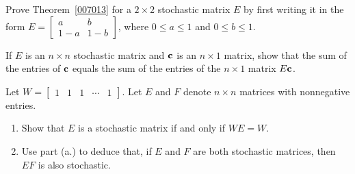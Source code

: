 \documentclass{ximera}
\begin{document}
\begin{problem}\label{prob:2x2proof}
Prove Theorem~\ref{007013} for a $2 \times 2$ stochastic matrix $E$ by first writing it in the form $E = \begin{bmatrix}
a & b \\
1 - a & 1 - b
\end{bmatrix}$, where $0 \leq a \leq 1$ and $0 \leq b \leq 1$.

\end{problem}

\begin{problem}\label{prob:i/o_7}
If $E$ is an $n \times n$ stochastic matrix and ${\bf c}$ is an $n \times 1$ matrix, show that the sum of the entries of ${\bf c}$ equals the sum of the entries of the $n \times 1$ matrix $E{\bf c}$.
\end{problem}

\begin{problem}\label{prob:i/o_8}
Let $W = \begin{bmatrix}
1 & 1 & 1 & \cdots & 1
\end{bmatrix}$. Let $E$ and $F$ denote $n \times n$ matrices with nonnegative entries.

\begin{enumerate}
    \item Show that $E$ is a stochastic matrix if and only if $WE = W$.
    \item Use part (a.) to deduce that, if $E$ and $F$ are both stochastic matrices, then $EF$ is also stochastic.
\end{enumerate}
\end{problem} 
\end{document}

